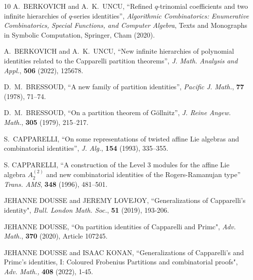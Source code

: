 \documentclass[12pt,a4paper]{amsart}
\theoremstyle{definition}
\theoremstyle{notation}
\theoremstyle{corollary}
\begin{document}
\begin{thebibliography}{10}
A.~BERKOVICH and A.~K.~UNCU, ``Refined $q$-trinomial coefficients and two
infinite hierarchies of $q$-series identities'', \textit{Algorithmic Combinatorics: Enumerative Combinatorics, Special Functions, and Computer Algebra}, Texts and Monographs in Symbolic Computation, Springer, Cham (2020).


A.~BERKOVICH and A.~K.~UNCU, ``New infinite hierarchies of polynomial identities related to the Capparelli partition theorems'', \textit{J. Math. Analysis and Appl.}, \textbf{506} (2022), 125678.

D.~M.~BRESSOUD, ``A new family of partition identities'', \textit{Pacific J. Math.}, \textbf{77} (1978), 71--74.


D.~M.~BRESSOUD, ``On a partition theorem of G\"ollnitz'', \textit{J. Reine Angew. Math.}, \textbf{305} (1979), 215--217.



S.~CAPPARELLI, ``On some representations of twisted affine Lie algebras and combinatorial identities'', \textit{J. Alg.}, \textbf{154} (1993), 335--355.

S. CAPPARELLI, ``A construction of the Level 3 modules for the affine Lie algebra
$A^{(2)}_2$ and new combinatorial identities of the Rogers-Ramanujan type” \textit{Trans. AMS}, \textbf{348} (1996), 481–501.


JEHANNE DOUSSE and JEREMY LOVEJOY, ``Generalizations 
of Capparelli's identity", {\it{Bull. London Math. Soc.}}, \textbf{51} (2019), 193-206.

JEHANNE DOUSSE, ``On partition identities of Capparelli 
and Primc",   {\it{Adv. Math.}}, {\bf{370}} (2020), Article 107245. 

JEHANNE DOUSSE and ISAAC KONAN, ``Generalizations of 
Capparelli's and Primc's identities, I: Coloured Frobenius 
Partitions and combinatorial proofs", {\it{Adv. Math.,}} {\bf{408}} (2022), 1-45. 



\end{thebibliography}
\end{document}
